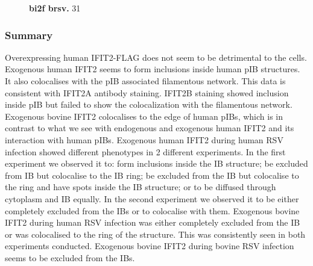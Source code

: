 \begin{figure}
\begin{subfigure}{1\textwidth}
    \end{subfigure}
    \caption[bi2f brsv]{\textbf{bi2f brsv.} 31}
    \label{fig:bi2f brsv}
\end{figure}

\subsubsection{Summary} \label{Summary-i2-flag}
Overexpressing human IFIT2-FLAG does not seem to be detrimental to the cells. Exogenous human IFIT2 seems to form inclusions inside human pIB structures. It also colocalises with the pIB associated filamentous network. This data is consistent with IFIT2A antibody staining. IFIT2B staining showed inclusion inside pIB but failed to show the colocalization with the filamentous network. Exogenous bovine IFIT2 colocalises to the edge of human pIBs, which is in contrast to what we see with endogenous and exogenous human IFIT2 and its interaction with human pIBs. Exogenous human IFIT2 during human RSV infection showed different phenotypes in 2 different experiments. In the first experiment we observed it to: form inclusions inside the IB structure; be excluded from IB but colocalise to the IB ring; be excluded from the IB but colocalise to the ring and have spots inside the IB structure; or to be diffused through cytoplasm and IB equally. In the second experiment we observed it to be either completely excluded from the IBs or to colocalise with them. Exogenous bovine IFIT2 during human RSV infection was either completely excluded from the IB or was colocalised to the ring of the structure. This was consistently seen in both experiments conducted. Exogenous bovine IFIT2 during bovine RSV infection seems to be excluded from the IBs.